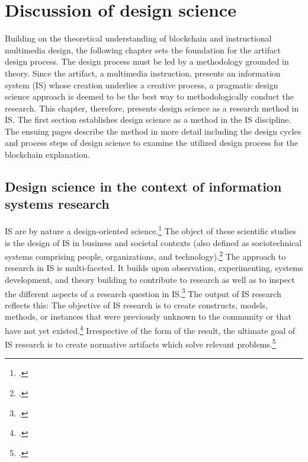 \chapter{Discussion of design science} \label{chap:DesignScience}

Building on the theoretical understanding of blockchain and instructional multimedia design, the following chapter sets the foundation for the artifact design process. The design process must be led by a methodology grounded in theory. Since the artifact, a multimedia instruction, presents an information system (\acs{IS}) whose creation underlies a creative process, a pragmatic design science approach is deemed to be the best way to methodologically conduct the research. This chapter, therefore, presents design science as a research method in \ac{IS}. The first section establishes design science as a method in the \ac{IS} discipline. The ensuing pages describe the method in more detail including the design cycles and process steps of design science to examine the utilized design process for the blockchain explanation.

\section{Design science in the context of information systems research} \label{DesignScienceInISR}

\acf{IS} are by nature a design-oriented science.\footcites[Cf. in addition][]{OsterleGestaltungsorientierteWirtschaftsinformatikPladoyer2010} The object of these scientific studies is the design of \ac{IS} in business and societal contexts (also defined as sociotechnical systems comprising people, organizations, and technology).\footcites[Cf.][p.671]{OsterleMemorandumzurgestaltungsorientierten2010}[cf.][p.98]{HevnerDesignScienceResearch2004}[cf.][p.11]{OsterleGestaltungsorientierteWirtschaftsinformatikPladoyer2010}[cf.][p.252]{MarchDesignnaturalscience1995}
The approach to research in \ac{IS} is multi-faceted. It builds upon observation, experimenting, systems development, and theory building to contribute to research as well as to inspect the different aspects of a research question in \ac{IS}.\footcite[Cf.][p.86]{NunamakerSystemsdevelopmentInformation1991} The output of \ac{IS} research reflects this: The objective of \ac{IS} research is to create constructs, models, methods, or instances that were previously unknown to the community or that have not yet existed.\footcites[Cf.][p.12]{OsterleGestaltungsorientierteWirtschaftsinformatikPladoyer2010}[cf.][p.130]{ThomasBekannteundweniger2014} 
Irrespective of the form of the result, the ultimate goal of \ac{IS} research is to create normative artifacts which solve relevant problems.\footcite[Cf.][p.130]{ThomasBekannteundweniger2014}

